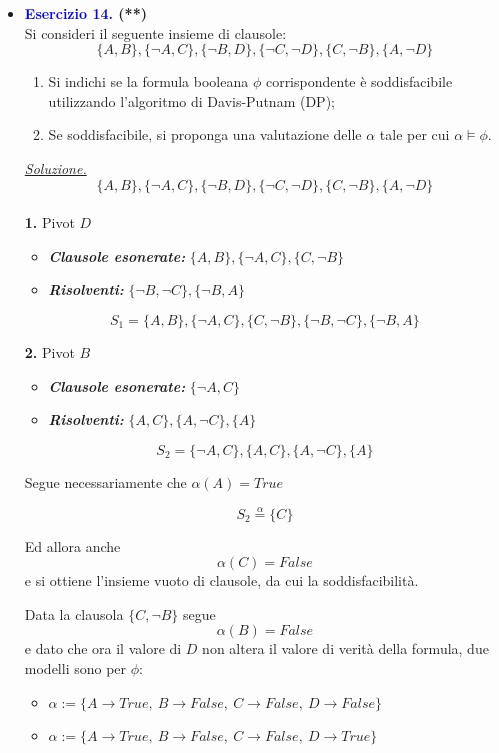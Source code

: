 \documentclass[a4paper,10pt]{article}
\begin{document}
{\begin{itemize}[label=, leftmargin=0pt]
    \item \textbf{\textcolor{blue}{Esercizio 14.} (**)}\\ 	
    Si consideri il seguente insieme di clausole:
    $$\{A, B\}, \{\lnot A, C\}, \{\lnot B, D\}, \{\lnot C, \lnot D\}, \{C, \lnot B\}, \{A, \lnot D\}$$
    \begin{enumerate}
        \item Si indichi se la formula booleana $\phi$ corrispondente è soddisfacibile utilizzando l'algoritmo di Davis-Putnam (DP);
        \item Se soddisfacibile, si proponga una valutazione delle  $\alpha$ tale per cui $\alpha\models\phi$.\\[0.2cm]
    \end{enumerate}

    \begin{osservazioni}
    \underline{\textit{Soluzione.}}
    $$\{A, B\}, \{\lnot A, C\}, \{\lnot B, D\}, \{\lnot C, \lnot D\}, \{C, \lnot B\}, \{A, \lnot D\}$$\\
    
    \textbf{1.} Pivot $D$
    \begin{itemize}
        \item \textbf{\textit{Clausole esonerate:}} $\{A, B\}, \{\lnot A, C\}, \{C, \lnot B\}$
        \item \textbf{\textit{Risolventi:}} $\{\lnot B, \lnot C\}, \{\lnot B, A\}$
    \end{itemize}
    $$S_1 = \{A, B\}, \{\lnot A, C\}, \{C, \lnot B\},\{\lnot B, \lnot C\}, \{\lnot B, A\}$$

    \textbf{2.} Pivot $B$
    \begin{itemize}
        \item \textbf{\textit{Clausole esonerate:}} $\{\lnot A, C\}$
        \item \textbf{\textit{Risolventi:}} $\{A, C\},\{A, \lnot C\},\{A\}$
    \end{itemize}
    $$S_2 = \{\lnot A, C\},\{A, C\},\{A, \lnot C\},\{A\}$$
    
    Segue necessariamente che $\alpha(A)=True$

    $$S_2 \overset{\alpha}{=} \{C\}$$

    Ed allora anche $$\alpha(C)=False$$ e si ottiene l'insieme vuoto di clausole, da cui la soddisfacibilità.

    Data la clausola $\{C, \lnot B\}$ segue $$\alpha(B)=False$$ e dato che ora il valore di $D$ non altera il valore di verità della formula, due modelli sono per $\phi$:
    \begin{itemize}
        \item $\alpha := \{A\rightarrow True,\ B\rightarrow False,\ C\rightarrow False,\ D\rightarrow False\} $
        \item $\alpha := \{A\rightarrow True,\ B\rightarrow False,\ C\rightarrow False,\ D\rightarrow True\} $
    \end{itemize}    
    \end{osservazioni}
    

\end{itemize}}
\end{document}
